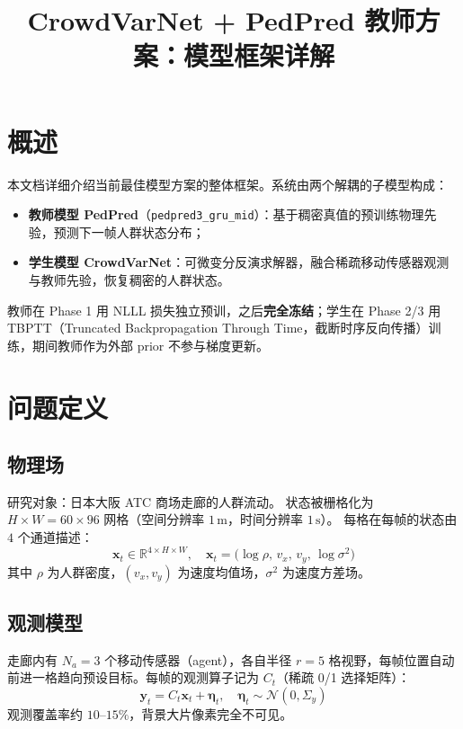 \documentclass[11pt,a4paper]{ctexart}
\title{CrowdVarNet + PedPred 教师方案：模型框架详解}
\author{}
\date{}
\begin{document}
\maketitle

\section{概述}

本文档详细介绍当前最佳模型方案的整体框架。系统由两个解耦的子模型构成：

\begin{itemize}
  \item \textbf{教师模型 PedPred}（\texttt{pedpred3\_gru\_mid}）：基于稠密真值的预训练物理先验，预测下一帧人群状态分布；
  \item \textbf{学生模型 CrowdVarNet}：可微变分反演求解器，融合稀疏移动传感器观测与教师先验，恢复稠密的人群状态。
\end{itemize}

教师在 Phase 1 用 NLLL 损失独立预训，之后\textbf{完全冻结}；学生在 Phase 2/3 用 TBPTT（Truncated Backpropagation Through Time，截断时序反向传播）训练，期间教师作为外部 prior 不参与梯度更新。

\section{问题定义}

\subsection{物理场}

研究对象：日本大阪 ATC 商场走廊的人群流动。
状态被栅格化为 $H\times W = 60\times 96$ 网格（空间分辨率 $1\,\mathrm{m}$，时间分辨率 $1\,\mathrm{s}$）。
每格在每帧的状态由 $4$ 个通道描述：
\begin{equation}
\mathbf{x}_t \in \mathbb{R}^{4\times H\times W}, \quad
\mathbf{x}_t = \bigl(\log\rho,\,v_x,\,v_y,\,\log\sigma^2\bigr)
\end{equation}
其中 $\rho$ 为人群密度，$(v_x, v_y)$ 为速度均值场，$\sigma^2$ 为速度方差场。

\subsection{观测模型}

走廊内有 $N_a=3$ 个移动传感器（agent），各自半径 $r=5$ 格视野，每帧位置自动前进一格趋向预设目标。每帧的观测算子记为 $C_t$（稀疏 0/1 选择矩阵）：
\begin{equation}
\mathbf{y}_t = C_t \mathbf{x}_t + \boldsymbol{\eta}_t, \quad \boldsymbol{\eta}_t \sim \mathcal{N}(0,\Sigma_y)
\end{equation}
观测覆盖率约 $10\text{--}15\%$，背景大片像素完全不可见。
\end{document}
